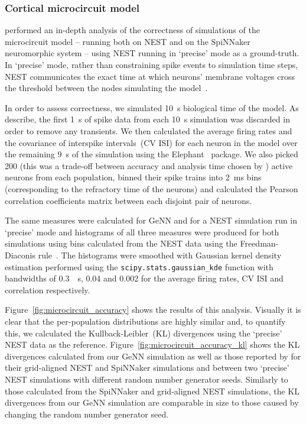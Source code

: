 \documentclass[utf8]{frontiersSCNS} %
\begin{document}
\subsubsection{Cortical microcircuit model}
\citet{VanAlbada2018} performed an in-depth analysis of the correctness of simulations of the microcircuit model -- running both on NEST and on the SpiNNaker neuromorphic system -- using NEST running in `precise' mode as a ground-truth.
In `precise' mode, rather than constraining spike events to simulation time steps, NEST communicates the exact time at which neurons' membrane voltages cross the threshold between the nodes simulating the model~\citep{Hanuschkin2010}.

In order to assess correctness, we simulated \SI{10}{\second} biological time of the model. As \citeauthor{VanAlbada2018} describe, the first \SI{1}{\second} of spike data from each \SI{10}{\second} simulation was discarded in order to remove any transients.
We then calculated the average firing rates and the covariance of interspike intervals~(CV ISI) for each neuron in the model over the remaining \SI{9}{\second} of the simulation using the Elephant~\citep{Yegenoglu2018} package.
We also picked \num{200} (this was a trade-off between accuracy and analysis time chosen by \citeauthor{VanAlbada2018}) active neurons from each population, binned their spike trains into \SI{2}{\milli\second} bins (corresponding to the refractory time of the neurons) and calculated the Pearson correlation coefficients matrix between each disjoint pair of neurons.

The same measures were calculated for GeNN and for a NEST simulation run in `precise' mode and histograms of all three measures were produced for both simulations using bins calculated from the NEST data using the Freedman-Diaconis rule~\citep{Freedman1981}.
The histograms were smoothed with Gaussian kernel density estimation performed using the \lstinline{scipy.stats.gaussian_kde} function with bandwidths of \SI{0.3}{\per\second}, \num{0.04} and \num{0.002} for the average firing rates, CV ISI and correlation respectively.

Figure~\ref{fig:microcircuit_accuracy} shows the results of this analysis.
Visually it is clear that the per-population distributions are highly similar and, to quantify this, we calculated the Kullback-Leibler~(KL) divergences using the `precise' NEST data as the reference.
Figure~\ref{fig:microcircuit_accuracy_kl} shows the KL divergences calculated from our GeNN simulation as well as those reported by \citet{VanAlbada2018} for their grid-aligned NEST and SpiNNaker simulations and between two `precise' NEST simulations with different random number generator seeds. 
Similarly to those calculated from the SpiNNaker and grid-aligned NEST simulations, the KL divergences from our GeNN simulation are comparable in size to those caused by changing the random number generator seed.
\end{document}
